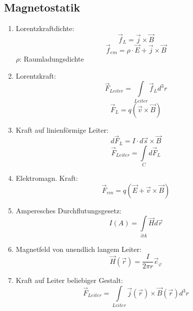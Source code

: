 \documentclass[a4paper,twocolumn,10pt]{article}
\begin{document}
\subsection{Magnetostatik}
\begin{enumerate}[label=$\bullet$]
\item Lorentzkraftdichte:
\begin{equation*}
\overrightarrow{f}_L=\overrightarrow{j}\times\overrightarrow{B}
\end{equation*}
\begin{equation*}
\overrightarrow{f}_{em}=\rho\cdot\overrightarrow{E}+\overrightarrow{j}\times\overrightarrow{B}
\end{equation*}
$\rho$: Raumladungsdichte
\item Lorentzkraft:
\begin{equation*}
\overrightarrow{F}_{Leiter}=\int\limits_{Leiter}\overrightarrow{f}_L d^3r
\end{equation*}
\begin{equation*}
\overrightarrow{F}_L=q(\overrightarrow{v}\times\overrightarrow{B})
\end{equation*}
\item Kraft auf linienförmige Leiter:
\begin{equation*}
d\overrightarrow{F}_L=I\cdot d\overrightarrow{s}\times\overrightarrow{B}
\end{equation*}
\begin{equation*}
\overrightarrow{F}_{Leiter}=\int\limits_{C}d\overrightarrow{F}_L
\end{equation*}
\item Elektromagn. Kraft:
\begin{equation*}
\overrightarrow{F}_{em}=q(\overrightarrow{E}+\overrightarrow{v}\times\overrightarrow{B})
\end{equation*}
\item Amperesches Durchflutungsgesetz:
\begin{equation*}
I(A)=\int\limits_{\partial A}\overrightarrow{H}d\overrightarrow{r}
\end{equation*}
\item Magnetfeld von unendlich langem Leiter:
\begin{equation*}
\overrightarrow{H}(\overrightarrow{r})=\frac{I}{2\pi r}\overrightarrow{e}_\varphi
\end{equation*}
\item Kraft auf Leiter beliebiger Gestalt:
\begin{equation*}
\overrightarrow{F}_{Leiter}=\int\limits_{Leiter}\overrightarrow{j}(\overrightarrow{r})\times\overrightarrow{B}(\overrightarrow{r})d^3r

\end{equation*}
\end{enumerate}
\end{document}
